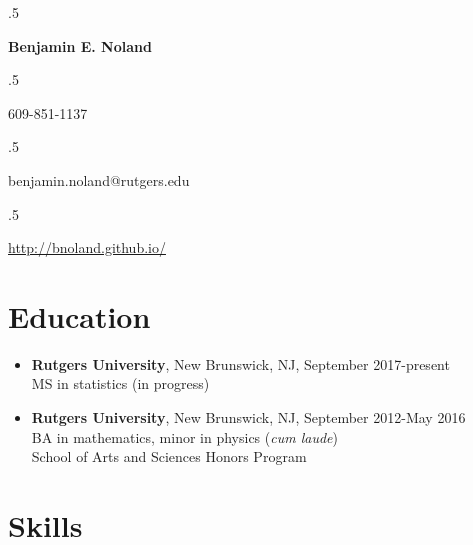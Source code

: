 \documentclass[letterpaper,12pt]{article}
\begin{document}
\moveleft.5\hoffset\centerline{\Large\bf Benjamin E. Noland}
\smallskip
\moveleft.5\hoffset\centerline{609-851-1137}
\moveleft.5\hoffset\centerline{benjamin.noland@rutgers.edu}
\moveleft.5\hoffset\centerline{\url{http://bnoland.github.io/}}

\section*{Education}

\begin{itemize}
\item
\textbf{Rutgers University}, New Brunswick, NJ, September 2017-present \\
MS in statistics (in progress)

\item
\textbf{Rutgers University}, New Brunswick, NJ, September 2012-May 2016 \\
BA in mathematics, minor in physics (\textit{cum laude}) \\
School of Arts and Sciences Honors Program
\end{itemize}
\iffalse
\subsection*{Selection of coursework:}
\begin{itemize}
\item
\textbf{Mathematics:} Calculus, linear algebra, ordinary differential equations, real analysis, 
complex variables, differential geometry, linear programming, abstract algebra, topology 
\textit{(taken at Rutgers University)}

\item
\textbf{Physics:}
Classical mechanics, electromagnetism, astrophysics \textit{(taken at Rutgers University)}

\item
\textbf{Computer science:}
Systems programming, data structures and algorithms \textit{(taken at Princeton University while in 
high school)}; Advanced Placement computer science \textit{(taken in high school)}

\item
\textbf{Statistics:} Advanced Placement statistics \textit{(taken in high school)}, probability 
theory, regression analysis \textit{(taking at Rutgers University)}

\end{itemize}
\fi
\section*{Skills}
\end{document}
